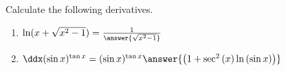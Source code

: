 \documentclass{ximera}
\author{Nela Lakos}
\begin{document}
\begin{exercise}

Calculate the following derivatives.
\begin{enumerate}
\item $\ln(x+\sqrt{x^2-1}) =\frac{1}{\answer{\sqrt{x^2-1}}}$\\
\item$ \ddx(\sin x)^{\tan{x}} = (\sin{x})^{\tan{x}}\answer{\left(1+\sec^2{(x)}\ln{(\sin{x})}\right)}$\\
\end{enumerate}
\end{exercise}
\end{document}

